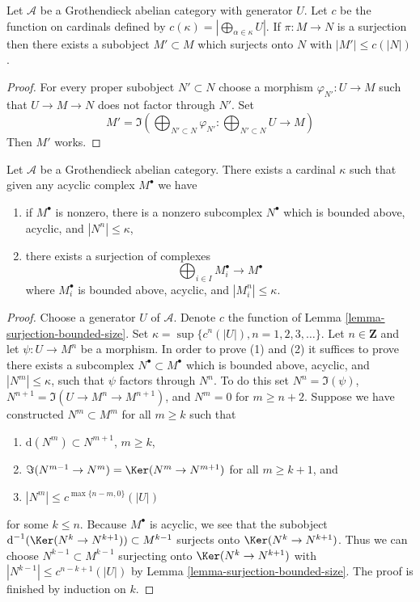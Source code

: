 \begin{lemma}
\label{lemma-surjection-bounded-size}
Let $\mathcal{A}$ be a Grothendieck abelian category with generator $U$.
Let $c$ be the function on cardinals defined by
$c(\kappa) = |\bigoplus_{\alpha \in \kappa} U|$. If $\pi : M \to N$ is a
surjection then there exists a subobject $M' \subset M$ which surjects
onto $N$ with $|M'| \leq c(|N|)$.
\end{lemma}

\begin{proof}
For every proper subobject $N' \subset N$ choose a morphism
$\varphi_{N'} : U \to M$ such that $U \to M \to N$ does not factor
through $N'$. Set
$$
M' = \Im\left(
\bigoplus\nolimits_{N' \subset N} \varphi_{N'} :
\bigoplus\nolimits_{N' \subset N} U \longrightarrow M\right)
$$
Then $M'$ works.
\end{proof}

\begin{lemma}
\label{lemma-acyclic-quotient-complexes-bounded-size}
Let $\mathcal{A}$ be a Grothendieck abelian category. There exists a cardinal
$\kappa$ such that given any acyclic complex $M^\bullet$ we have
\begin{enumerate}
\item if $M^\bullet$ is nonzero, there is a nonzero subcomplex
$N^\bullet$ which is bounded above, acyclic, and $|N^n| \leq \kappa$,
\item there exists a surjection of complexes
$$
\bigoplus\nolimits_{i \in I} M_i^\bullet \longrightarrow M^\bullet
$$
where $M_i^\bullet$ is bounded above, acyclic, and $|M_i^n| \leq \kappa$.
\end{enumerate}
\end{lemma}

\begin{proof}
Choose a generator $U$ of $\mathcal{A}$. Denote $c$ the function of
Lemma \ref{lemma-surjection-bounded-size}.
Set $\kappa = \sup \{c^n(|U|), n = 1, 2, 3, \ldots\}$.
Let $n \in \mathbf{Z}$ and let $\psi : U \to M^n$ be a morphism.
In order to prove (1) and (2) it suffices to prove there exists a subcomplex
$N^\bullet \subset M^\bullet$ which is bounded above, acyclic, and
$|N^m| \leq \kappa$, such that $\psi$ factors through $N^n$.
To do this set $N^n = \Im(\psi)$, $N^{n + 1} = \Im(U \to M^n \to M^{n + 1})$,
and $N^m = 0$ for $m \geq n + 2$.
Suppose we have constructed $N^m \subset M^m$ for all $m \geq k$ such that
\begin{enumerate}
\item $\text{d}(N^m) \subset N^{m + 1}$, $m \geq k$,
\item $\Im(N^{m - 1} \to N^m) = \Ker(N^m \to N^{m + 1})$ for
all $m \geq k + 1$, and
\item $|N^m| \leq c^{\max\{n - m, 0\}}(|U|)$
\end{enumerate}
for some $k \leq n$. Because $M^\bullet$ is acyclic, we see that the subobject
$\text{d}^{-1}(\Ker(N^k \to N^{k + 1})) \subset M^{k - 1}$ surjects onto
$\Ker(N^k \to N^{k + 1})$. Thus we can choose $N^{k - 1} \subset M^{k - 1}$
surjecting onto $\Ker(N^k \to N^{k + 1})$ with
$|N^{k - 1}| \leq c^{n - k + 1}(|U|)$ by
Lemma \ref{lemma-surjection-bounded-size}. The proof is finished by
induction on $k$.
\end{proof}

